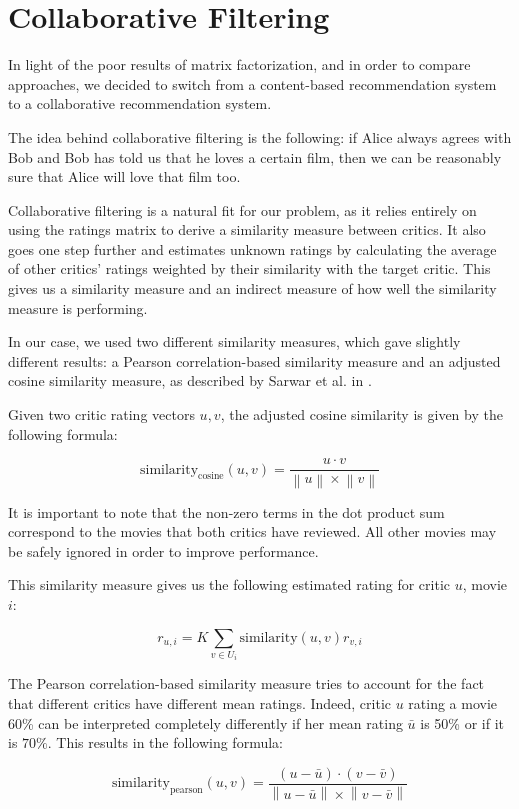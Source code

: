 \documentclass[12pt]{article}
\newcommand{\norm}[1]{\left\lVert#1\right\rVert}
\begin{document}
\section{Collaborative Filtering}

In light of the poor results of matrix factorization, and in order to compare 
approaches, we decided to switch from a content-based recommendation system to
a collaborative recommendation system.

The idea behind collaborative filtering is the following: if Alice always
agrees with Bob and Bob has told us that he loves a certain film, then we can
be reasonably sure that Alice will love that film too.

Collaborative filtering is a natural fit for our problem, as it relies entirely
on using the ratings matrix to derive a similarity measure between critics. It
also goes one step further and estimates unknown ratings by calculating the
average of other critics' ratings weighted by their similarity with the target
critic. This gives us a similarity measure and an indirect measure of how well
the similarity measure is performing.

In our case, we used two different similarity measures, which gave slightly
different results: a Pearson correlation-based similarity measure and an
adjusted cosine similarity measure, as described by Sarwar et al. in
\cite{Sarwar01}.

Given two critic rating vectors $u,v$, the adjusted cosine similarity is given
by the following formula:

$$ \text{similarity}_{\text{cosine}}(u,v) = \frac{u \cdot v}{\norm{u} \times \norm{v}} $$

It is important to note that the non-zero terms in the dot product sum
correspond to the movies that both critics have reviewed. All other movies may
be safely ignored in order to improve performance.

This similarity measure gives us the following estimated rating for critic $u$,
movie $i$:

$$ r_{u,i} = K \sum_{v \in U_i} \text{similarity}(u,v) r_{v,i} $$

The Pearson correlation-based similarity measure tries to account for the fact
that different critics have different mean ratings. Indeed, critic $u$ rating a
movie 60\% can be interpreted completely differently if her mean rating
$\bar{u}$ is 50\% or if it is $70\%$. This results in the following formula:

$$ \text{similarity}_{\text{pearson}}(u,v) = \frac{ (u - \bar{u}) \cdot (v - \bar{v})}{\norm{u - \bar{u}} \times \norm{v-\bar{v}}} $$
\end{document}
